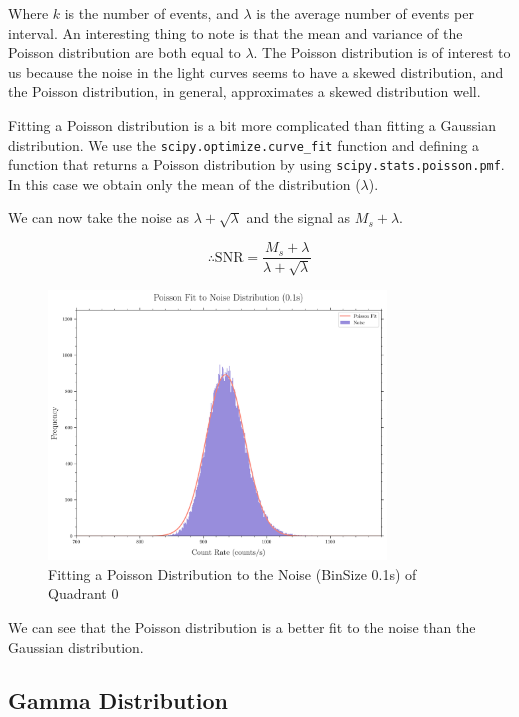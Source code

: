 \documentclass[11pt]{book} %
\begin{document}
Where $k$ is the number of events, and $\lambda$ is the average number of events per interval. An interesting thing to note is that the mean and variance of the Poisson distribution are both equal to $\lambda$. The Poisson distribution is of interest to us because the noise in the light curves seems to have a skewed distribution, and the Poisson distribution, in general, approximates a skewed distribution well.

Fitting a Poisson distribution is a bit more complicated than fitting a Gaussian distribution. We use the \lstinline[language=Python]{scipy.optimize.curve_fit} function and defining a function that returns a Poisson distribution by using \lstinline[language=Python]{scipy.stats.poisson.pmf}. In this case we obtain only the mean of the distribution ($\lambda$). 

We can now take the noise as $\lambda+\sqrt{\lambda}$ and the signal as $M_s+\lambda$. 

\begin{equation}
    \therefore \text{SNR} = \frac{M_s+\lambda}{\lambda+\sqrt{\lambda}}
\end{equation}

\begin{figure}[H]
    \centering
    \includegraphics[width=0.8\textwidth]{Pictures/poisson_fit.png}
    \caption{Fitting a Poisson Distribution to the Noise (BinSize 0.1s) of Quadrant 0}
\end{figure}

We can see that the Poisson distribution is a better fit to the noise than the Gaussian distribution.


\subsection{Gamma Distribution}
\end{document}
